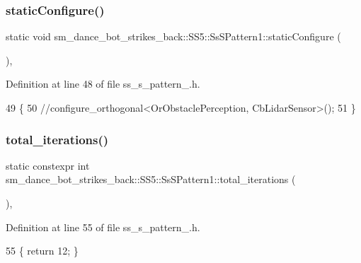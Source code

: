 \subsubsection{\texorpdfstring{static\+Configure()}{staticConfigure()}}
{\footnotesize\ttfamily static void sm\+\_\+dance\+\_\+bot\+\_\+strikes\+\_\+back\+::\+S\+S5\+::\+Ss\+S\+Pattern1\+::static\+Configure (\begin{DoxyParamCaption}{ }\end{DoxyParamCaption})\hspace{0.3cm}{\ttfamily [inline]}, {\ttfamily [static]}}



Definition at line 48 of file ss\+\_\+s\+\_\+pattern\+\_.\+h.


\begin{DoxyCode}
49     \{
50         \textcolor{comment}{//configure\_orthogonal<OrObstaclePerception, CbLidarSensor>();}
51     \}
\end{DoxyCode}
\mbox{\label{structsm__dance__bot__strikes__back_1_1SS5_1_1SsSPattern1_ac727a29abc528788363f77ed237ac29f}} 
\subsubsection{\texorpdfstring{total\+\_\+iterations()}{total\_iterations()}}
{\footnotesize\ttfamily static constexpr int sm\+\_\+dance\+\_\+bot\+\_\+strikes\+\_\+back\+::\+S\+S5\+::\+Ss\+S\+Pattern1\+::total\+\_\+iterations (\begin{DoxyParamCaption}{ }\end{DoxyParamCaption})\hspace{0.3cm}{\ttfamily [inline]}, {\ttfamily [static]}}



Definition at line 55 of file ss\+\_\+s\+\_\+pattern\+\_.\+h.


\begin{DoxyCode}
55 \{ \textcolor{keywordflow}{return} 12; \}
\end{DoxyCode}


